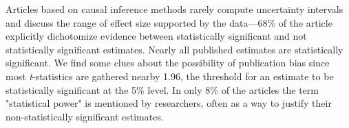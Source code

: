     
     Articles based on causal inference methods rarely compute uncertainty intervals and discuss the range of effect size supported by the data---68\% of the article explicitly dichotomize evidence between statistically significant and not statistically significant estimates. Nearly all published estimates are statistically significant. We find some clues about the possibility of publication bias since most \textit{t}-statistics are gathered nearby 1.96, the threshold for an estimate to be statistically significant at the 5\% level. In only 8\% of the articles the term "statistical power" is mentioned by researchers, often as a way to justify their non-statistically significant estimates. 
     
     
     
